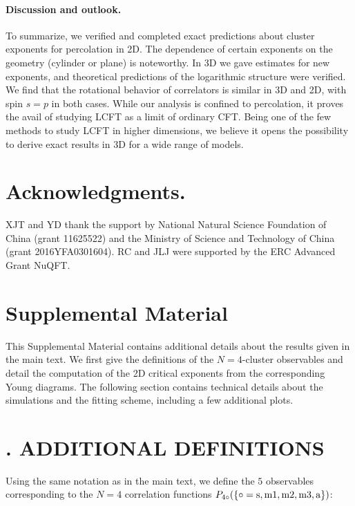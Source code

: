 \documentclass[aps,prl,twocolumn,showpacs,superscriptaddress,groupedaddress]{revtex4}  %
\newcommand*{\rom}[1]{\expandafter \romannumeral #1}
\begin{document}
\paragraph{Discussion and outlook.} 
To summarize, we verified and completed exact predictions about cluster exponents for percolation in 2D. The dependence of certain exponents on the geometry (cylinder or plane) is noteworthy. In 3D we gave estimates for new exponents, and theoretical predictions \cite{VJS} of the logarithmic structure were ve\-ri\-fied. We find that the rotational behavior of correlators is similar in 3D and 2D, with spin $s=p$ in both cases.
While our analysis is confined to percolation, it proves the avail of studying LCFT as a limit of ordinary CFT. Being one of the few methods to study LCFT in higher dimensions, we believe it opens the possibility to derive exact results in 3D for a wide range of models. 


\section*{ Acknowledgments.}  XJT and YD thank the support by National
Natural Science Foundation of China (grant 11625522) and the
Ministry of Science and Technology of China (grant 2016YFA0301604). 
RC and JLJ were supported by the ERC Advanced Grant NuQFT.




\newpage
\clearpage
\onecolumngrid
\section{Supplemental Material}
\onecolumngrid
This Supplemental Material contains additional details about the results given in the main text. We first give the definitions of the $N=4$-cluster observables and detail the computation of the 2D critical exponents from the corresponding Young diagrams. The following section contains technical details about the simulations and the fitting scheme, including a few additional plots.
\section{\rom{1}. ADDITIONAL DEFINITIONS}
Using the same notation as in the main text, we define the $5$ observables corresponding to the $N=4$ correlation functions $P_{\rm 4\circ}(\{\rm \circ=s,m1,m2,m3,a\})$:
\end{document}

